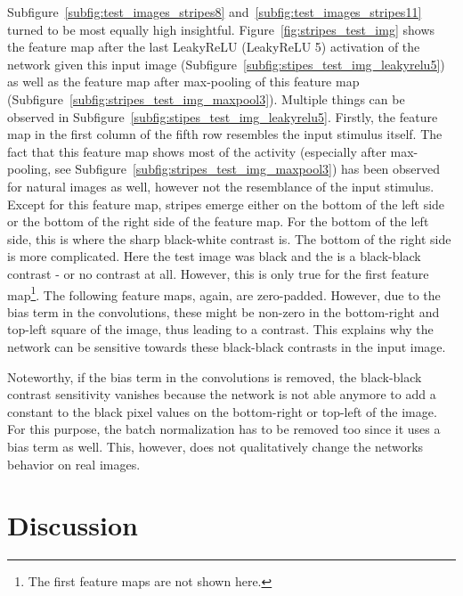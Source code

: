 \documentclass[11pt]{article}
\begin{document}
    Subfigure~\ref{subfig:test_images_stripes8} and~\ref{subfig:test_images_stripes11} turned to be most equally high insightful.
    Figure~\ref{fig:stripes_test_img} shows the feature map after the last LeakyReLU (LeakyReLU 5) activation of the network given this input image (Subfigure~\ref{subfig:stipes_test_img_leakyrelu5}) as well as the feature map after max-pooling of this feature map (Subfigure~\ref{subfig:stripes_test_img_maxpool3}).
    Multiple things can be observed in Subfigure~\ref{subfig:stipes_test_img_leakyrelu5}.
    Firstly, the feature map in the first column of the fifth row resembles the input stimulus itself.
    The fact that this feature map shows most of the activity (especially after max-pooling, see Subfigure~\ref{subfig:stripes_test_img_maxpool3}) has been observed for natural images as well, however not the resemblance of the input stimulus.
    Except for this feature map, stripes emerge either on the bottom of the left side or the bottom of the right side of the feature map.
    For the bottom of the left side, this is where the sharp black-white contrast is.
    The bottom of the right side is more complicated.
    Here the test image was black and the  is a black-black contrast - or no contrast at all.
    However, this is only true for the first feature map\footnote{The first feature maps are not shown here.}.
    The following feature maps, again, are zero-padded.
    However, due to the bias term in the convolutions, these might be non-zero in the bottom-right and top-left square of the image, thus leading to a contrast.
    This explains why the network can be sensitive towards these black-black contrasts in the input image.

    Noteworthy, if the bias term in the convolutions is removed, the black-black contrast sensitivity vanishes because the network is not able anymore to add a constant to the black pixel values on the bottom-right or top-left of the image.
    For this purpose, the batch normalization has to be removed too since it uses a bias term as well.
    This, however, does not qualitatively change the networks behavior on real images.


    \section{Discussion}\label{sec:discussion}
\end{document}
